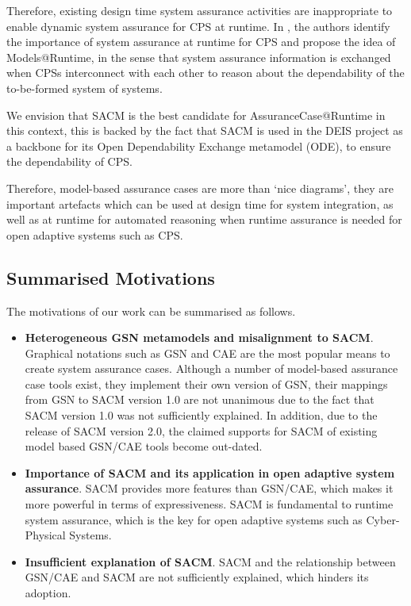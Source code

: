 Therefore, existing design time system assurance activities are inappropriate to enable dynamic system assurance for CPS at runtime. 
In \cite{trapp2013safety}, the authors identify the importance of system assurance at runtime for CPS and propose the idea of Models@Runtime, in the sense that system assurance information is exchanged when CPSs interconnect with each other to reason about the dependability of the to-be-formed system of systems.

We envision that SACM is the best candidate for AssuranceCase@Runtime in this context, this is backed by the fact that SACM is used in the DEIS project \cite{wei2017deis} as a backbone for its Open Dependability Exchange metamodel (ODE), to ensure the dependability of CPS. 


%
Therefore, model-based assurance cases are more than `nice diagrams', they are important artefacts which can be used at design time for system integration, as well as at runtime for automated reasoning when runtime assurance is needed for open adaptive systems such as CPS. 

\subsection{Summarised Motivations}
The motivations of our work can be summarised as follows. 
\begin{itemize}
	\item \textbf{Heterogeneous GSN metamodels and misalignment to SACM}. Graphical notations such as GSN and CAE are the most popular means to create system assurance cases.
	Although a number of model-based assurance case tools exist, they implement their own version of GSN, their mappings from GSN to SACM version 1.0 are not unanimous due to the fact that SACM version 1.0 was not sufficiently explained. 
	In addition, due to the release of SACM version 2.0, the claimed supports for SACM of existing model based GSN/CAE tools become out-dated.
	\item \textbf{Importance of SACM and its application in open adaptive system assurance}. SACM provides more features than GSN/CAE, which makes it more powerful in terms of expressiveness. 
	SACM is fundamental to runtime system assurance, which is the key for open adaptive systems such as Cyber-Physical Systems.
	\item \textbf{Insufficient explanation of SACM}. SACM and the relationship between GSN/CAE and SACM are not sufficiently explained, which hinders its adoption. 
\end{itemize}
